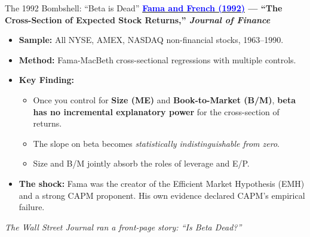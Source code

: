 \documentclass{beamer}
\begin{document}
\begin{frame}{The 1992 Bombshell: ``Beta is Dead''}
	\textbf{\href{https://doi.org/10.1111/j.1540-6261.1992.tb04398.x}{\textcolor{blue}{Fama and French (1992)}} --- ``The Cross-Section of Expected Stock Returns,'' \textit{Journal of Finance}}
	\vspace{6pt}
	\begin{itemize}
		\item \textbf{Sample:} All NYSE, AMEX, NASDAQ non-financial stocks, 1963--1990.
		\item \textbf{Method:} Fama-MacBeth cross-sectional regressions with multiple controls.
		\item \textbf{Key Finding:}
		\begin{itemize}
			\item Once you control for \textbf{Size (ME)} and \textbf{Book-to-Market (B/M)}, \textbf{beta has no incremental explanatory power} for the cross-section of returns.
			\item The slope on beta becomes \textit{statistically indistinguishable from zero}.
			\item Size and B/M jointly absorb the roles of leverage and E/P.
		\end{itemize}
		\item \textbf{The shock:} Fama was the creator of the Efficient Market Hypothesis (EMH) and a strong CAPM proponent. His own evidence declared CAPM's empirical failure.
	\end{itemize}
	\vspace{4pt}
	\footnotesize \textit{The Wall Street Journal ran a front-page story: ``Is Beta Dead?''}
\end{frame}
\end{document}
